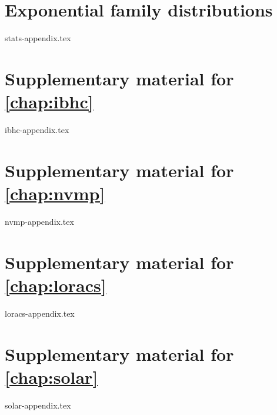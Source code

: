 \chapter{Exponential family distributions}
\label{chap:stats-appendix}
{stats-appendix.tex}

\chapter{Supplementary material for \autoref{chap:ibhc}}
\label{chap:ibhc-appendix}
{ibhc-appendix.tex}

\chapter{Supplementary material for \autoref{chap:nvmp}}
\label{chap:nvmp-appendix}
{nvmp-appendix.tex}

\chapter{Supplementary material for \autoref{chap:loracs}}
\label{chap:loracs-appendix}
{loracs-appendix.tex}

\chapter{Supplementary material for \autoref{chap:solar}}
\label{chap:solar-appendix}
{solar-appendix.tex}
